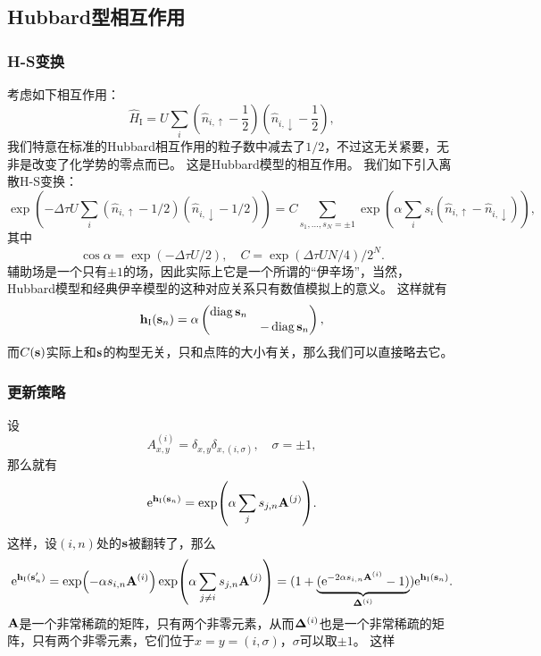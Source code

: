 \documentclass[hyperref, UTF8, a4paper]{ctexart}
\DeclareMathOperator{\diag}{diag}
\newcommand*{\ee}{\mathrm{e}}
\begin{document}
\subsection{Hubbard型相互作用}

\subsubsection{H-S变换}

考虑如下相互作用：
\begin{equation}
    \hat{H}_\text{I} = U \sum_i \left(\hat{n}_{i, \uparrow} - \frac{1}{2} \right) \left(\hat{n}_{i, \downarrow} - \frac{1}{2} \right),
\end{equation}
我们特意在标准的Hubbard相互作用的粒子数中减去了$1/2$，不过这无关紧要，无非是改变了化学势的零点而已。
这是Hubbard模型的相互作用。
我们如下引入离散H-S变换：
\begin{equation}
    \exp(-\Delta \tau U \sum_i (\hat{n}_{i, \uparrow} - 1/2) (\hat{n}_{i, \downarrow} - 1/2)) = C \sum_{s_1, \ldots, s_N = \pm 1} \exp(\alpha \sum_i s_i (\hat{n}_{i, \uparrow} - \hat{n}_{i, \downarrow})),
\end{equation}
其中
\begin{equation}
    \cos \alpha = \exp(-\Delta \tau U / 2), \quad C = \exp(\Delta \tau U N / 4) / 2^N.
\end{equation}
辅助场是一个只有$\pm 1$的场，因此实际上它是一个所谓的“伊辛场”，当然，Hubbard模型和经典伊辛模型的这种对应关系只有数值模拟上的意义。
这样就有
\begin{equation}
    \vb{h}_{\text{I}}(\vb{s}_n) = \alpha \pmqty{\dmat{\diag \vb{s}_n, - \diag \vb{s}_n}},
\end{equation}
而$C(\vb{s})$实际上和$\vb{s}$的构型无关，只和点阵的大小有关，那么我们可以直接略去它。

\subsubsection{更新策略}

设
\begin{equation}
    A_{x, y}^{(i)} = \delta_{x, y} \delta_{x, (i, \sigma)}, \quad \sigma = \pm 1,
\end{equation}
那么就有
\[
    \ee^{\vb{h}_\text{I}(\vb{s}_n)} = \exp(\alpha \sum_j s_{j, n} \vb{A}^{(j)}).
\]
这样，设$(i, n)$处的$\vb{s}$被翻转了，那么
\begin{equation}
    \ee^{\vb{h}_\text{I}(\vb{s}_n')} = \exp(-\alpha s_{i, n} \vb{A}^{(i)}) \exp(\alpha \sum_{j \neq i} s_{j, n} \vb{A}^{(j)}) = ( 1 + \underbrace{( \ee^{-2 \alpha s_{i, n} \vb{A}^{(i)}} - 1)}_{\vb{\Delta}^{(i)}} ) \ee^{\vb{h}_\text{I}(\vb{s}_n)} .
\end{equation}
$\vb{A}$是一个非常稀疏的矩阵，只有两个非零元素，从而$\vb{\Delta}^{(i)}$也是一个非常稀疏的矩阵，只有两个非零元素，它们位于$x=y=(i, \sigma)$，$\sigma$可以取$\pm 1$。
这样
\end{document}
